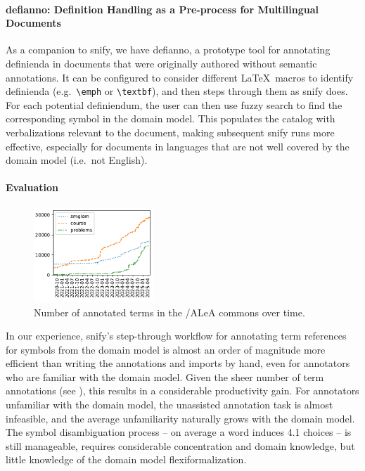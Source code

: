 \documentclass[runningheads]{llncs}
\newcommand\ALeA{\textsf{ALeA}\xspace}
\newcommand\snify{\textsf{snify}\xspace}
\newcommand\defianno{\textsf{defianno}\xspace}
\begin{document}
\paragraph{\defianno: Definition Handling as a Pre-process for Multilingual Documents}
As a companion to \snify, we have \defianno, a prototype tool for annotating definienda in
documents that were originally authored without semantic annotations.  It can be
configured to consider different \LaTeX\ macros to identify definienda (e.g.\
\lstinline[language={}]|\emph| or \lstinline[language={}]|\textbf|), and then steps
through them as \snify does.  For each potential definiendum, the user can then use fuzzy
search to find the corresponding symbol in the domain model.  This populates the catalog
with verbalizations relevant to the document, making subsequent \snify runs more
effective, especially for documents in languages that are not well covered by the domain
model (i.e.\ not English).

\paragraph{Evaluation}
\begin{figure}
  \centering
  \includegraphics[width=0.4\textwidth]{../img/annocounts.pdf}
  \caption{Number of annotated terms in the \sTeX/\ALeA commons over time.}\label{fig:annocounts}
\end{figure}
In our experience, \snify's step-through workflow for annotating term references for symbols
from the domain model is almost an order of magnitude more efficient than writing the
annotations and imports by hand, even for annotators who are familiar with the domain
model.
Given the sheer number of term annotations (see ),
this results in a considerable productivity gain.
For annotators unfamiliar with the domain model, the unassisted annotation task is
almost infeasible, and the average unfamiliarity naturally grows with the domain
model. The symbol disambiguation process -- on average a word induces 4.1 choices
-- is still manageable,
requires considerable concentration and domain knowledge, but little knowledge of the
domain model flexiformalization.
\end{document}
